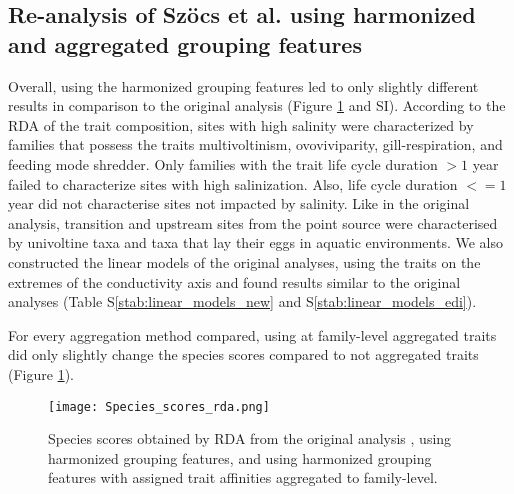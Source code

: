 \documentclass[../Draft_harmonization_paper.tex]{subfiles}
\begin{document}

\subsection*{Re-analysis of Szöcs et al. using harmonized and aggregated grouping features}

Overall, using the harmonized grouping features led to only slightly different results in comparison to the original analysis (Figure \ref{fig:rda_species_scores} and SI). According to the RDA of the trait composition, sites with high salinity were characterized by families that possess the traits multivoltinism, ovoviviparity, gill-respiration, and feeding mode shredder. Only families with the trait life cycle duration $> 1$ year failed to characterize sites with high salinization. Also, life cycle duration $<= 1$ year did not characterise sites not impacted by salinity. Like in the original analysis, transition and upstream sites from the point source were characterised by univoltine taxa and taxa that lay their eggs in aquatic environments. We also constructed the linear models of the original analyses, using the traits on the extremes of the conductivity axis and found results similar to the original analyses (Table S\ref{stab:linear_models_new} and S\ref{stab:linear_models_edi}).

For every aggregation method compared, using at family-level aggregated traits did only slightly change the species scores compared to not aggregated traits (Figure \ref{fig:rda_species_scores}). 

\begin{figure}[H]
    \label{fig:rda_species_scores}
    \centering
    \texttt{[image: Species\_scores\_rda.png]}
    \caption{Species scores obtained by RDA from the original analysis \cite{szocs_effects_2014}, using harmonized grouping features, and using harmonized grouping features with assigned trait affinities aggregated to family-level.}
    \label{fig:rda_species_scores}
\end{figure}

\end{document}
